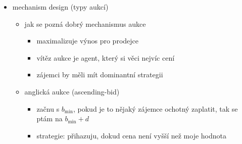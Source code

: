 \begin{itemize}
\begin{itemize}
\begin{itemize}
\begin{itemize}
\item strategický profil je \textit{Pareto optimální}, pokud neexistuje profil, který by ho Pareto dominoval
\end{itemize}
\item další zajímavým typem ekvilibria je korelované ekvilibrium
\end{itemize}
\item vězňovo dilema
\begin{itemize}
\item dva hráči (vězni)
\item vězeň může vypovídat (testify/defect) nebo odmítnout vypovídat (refuse/cooperate)
\begin{itemize}
\item oba vypovídají $\to$ oba ztrácejí málo (užitek -5)
\item jeden vypovídá, druhý ne $\to$ jeden neztratí nic (užitek 0), druhý hodně ztratí (užitek -10)
\item oba odmítnou $\to$ oba ztrácejí velmi málo (užitek -1)
\end{itemize}
\item \textit{vypovídat} je čistá dominantní strategie
\begin{itemize}
\item ale když vypovídají oba hráči, tak vyhrála policie - lepší by bylo, kdyby oba odmítli vypovídat
\item našli jsme Nashovo ekvilibrium - nikdo neprofituje ze změny strategie, pokud druhý hráč zůstane u stejné strategie
\end{itemize}
\end{itemize}
\end{itemize}
\item mechanism design (typy aukcí)
\begin{itemize}
\item jak se pozná dobrý mechanismus aukce
\begin{itemize}
\item maximalizuje výnos pro prodejce
\item vítěz aukce je agent, který si věci nejvíc cení
\item zájemci by měli mít dominantní strategii
\end{itemize}
\item anglická aukce (ascending-bid)
\begin{itemize}
\item začnu s $b_\text{min}$, pokud je to nějaký zájemce ochotný zaplatit, tak se ptám na $b_\text{min}+d$
\item strategie: přihazuju, dokud cena není vyšší než moje hodnota

\end{itemize}
\end{itemize}
\end{itemize}
